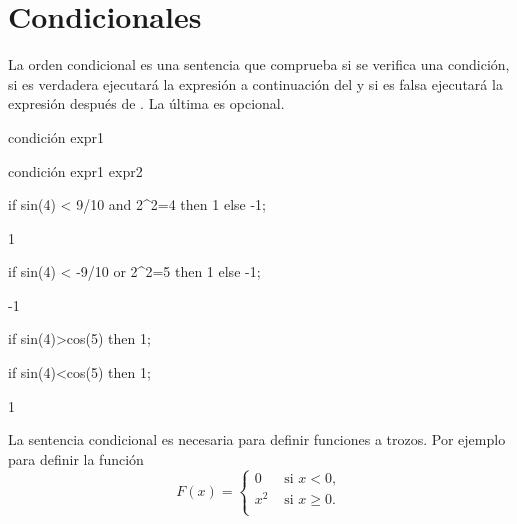 
\section{Condicionales}

La orden condicional  es una sentencia
que comprueba si se verifica una condición,
si es verdadera ejecutará la expresión a continuación
del  y si es falsa ejecutará la
expresión después de . La última es
opcional.

\begin{center}
	 condición  expr1
\end{center}
\begin{center}
	 condición  expr1
	 expr2
\end{center}

\begin{maximai}
if sin(4) < 9/10 and 2^2=4 then 1 else -1;
\end{maximai}
\begin{maximao}
1
\end{maximao}

\begin{maximai}
if sin(4) < -9/10 or 2^2=5 then 1 else -1;
\end{maximai}
\begin{maximao}
-1
\end{maximao}

\begin{maximai}
if sin(4)>cos(5) then 1;
\end{maximai}
\begin{maximao}
\end{maximao}

\begin{maximai}
if sin(4)<cos(5) then 1;
\end{maximai}
\begin{maximao}
1
\end{maximao}

La sentencia condicional  es necesaria para definir
funciones a trozos. Por ejemplo para definir la función
\begin{equation*}
	F(x)=\left\{ \begin{array}{cl}
		0 & \text{ si } x<0, \\
		x^2 & \text{ si } x\geq0. \\
	\end{array}\right.
\end{equation*}

